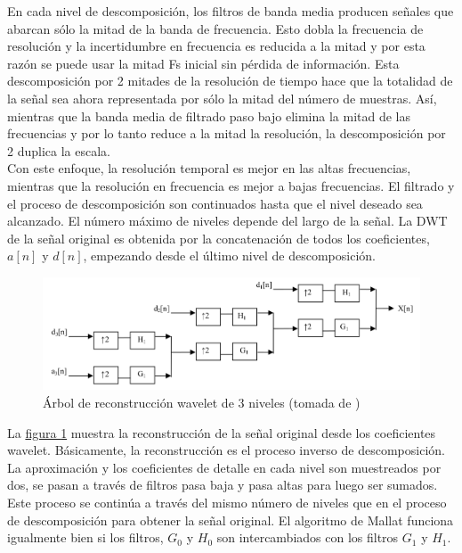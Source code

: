 \documentclass[11pt,lettersize]{article} %
\newcommand{\figura}[1]{\hyperref[{#1}]{figura \ref*{#1}}}
\begin{document}
En cada nivel de descomposición, los filtros de banda media producen señales que abarcan sólo la mitad de la banda de frecuencia. Esto dobla la frecuencia de resolución y la incertidumbre en frecuencia es reducida a la mitad y por esta razón se puede usar la mitad Fs inicial sin pérdida de información. Esta descomposición por 2 mitades de la resolución de tiempo hace que la totalidad de la señal sea ahora representada por sólo la mitad del número de muestras. Así, mientras que la banda media de filtrado paso bajo elimina la mitad de las frecuencias y por lo tanto reduce a la mitad la resolución, la descomposición por 2 duplica la escala.\\

Con este enfoque, la resolución temporal es mejor en las altas frecuencias, mientras que la resolución en frecuencia es mejor a bajas frecuencias. El filtrado y el proceso de descomposición son continuados hasta que el nivel deseado sea alcanzado. El número máximo de niveles depende del largo de la señal. La DWT de la señal original es obtenida por la concatenación de todos los coeficientes, $a[n]$ y $d[n]$, empezando desde el último nivel de descomposición.
\begin{figure}[h!]
	\centering
	\includegraphics[width=.9\textwidth]{images/reco-3.png}
	\caption[Árbol de reconstrucción wavelet de 3 niveles]{Árbol de reconstrucción wavelet de 3 niveles (tomada de \cite{Sripathi2003})}
	\label{F-reco-3}
\end{figure}

La \figura{F-reco-3} muestra la reconstrucción de la señal original desde los coeficientes wavelet. Básicamente, la reconstrucción es el proceso inverso de descomposición. La aproximación y los coeficientes de detalle en cada nivel son muestreados por dos, se pasan a través de filtros pasa baja y pasa altas para luego ser sumados. Este proceso se continúa a través del mismo número de niveles que en el proceso de descomposición para obtener la señal original. El algoritmo de Mallat funciona igualmente bien si los filtros, $G_0$ y $H_0$ son intercambiados con los filtros $G_1$ y $H_1$.\\
\end{document}
